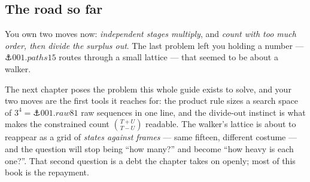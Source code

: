 \cleardoublepage
\begin{narrative}
\section*{The road so far}


\noindent You own two moves now: \emph{independent stages multiply}, and
\emph{count with too much order, then divide the surplus out}. The last
problem left you holding a number — $\anchor{001.paths15}$ routes through
a small lattice — that seemed to be about a walker.

The next chapter poses the problem this whole guide exists to solve, and
your two moves are the first tools it reaches for: the product rule sizes
a search space of $3^4 = \anchor{001.raw81}$ raw sequences in one line,
and the divide-out
instinct is what makes the constrained count $\binom{T+U}{T-U}$ readable.
The walker's lattice is about to reappear as a grid of \emph{states
against frames} — same fifteen, different costume — and the question
will stop being ``how many?'' and become ``how heavy is each one?''.
That second question is a debt the chapter takes on openly; most of this
book is the repayment.
\end{narrative}
